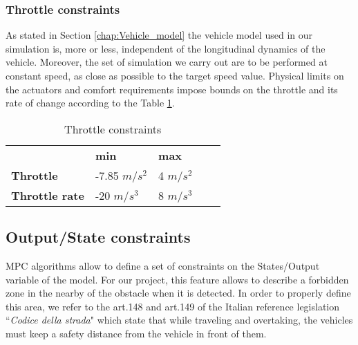 \subsubsection{Throttle constraints}
As stated in Section \ref{chap:Vehicle_model} the vehicle model used in our simulation is,  more or less, independent of the longitudinal dynamics of the vehicle. Moreover, the set of simulation we carry out are to be performed at constant speed, as close as possible to the target speed value. 
Physical limits on the actuators and comfort requirements impose bounds on the throttle and its rate of change according to the Table \ref{tab:throttle}.

\begin{table}[H]
\begin{center}
\begin{tabular}{lllll}
\cline{2-3}
\multicolumn{1}{l|}{} & \multicolumn{1}{l|}{\textbf{min}} & \multicolumn{1}{l|}{\textbf{max}} &  &  \\ \cline{1-3}
\multicolumn{1}{|l|}{\textbf{Throttle}} & \multicolumn{1}{l|}{-7.85 $m/s^2$}  & \multicolumn{1}{l|}{4 $m/s^2$} &  &  \\ \cline{1-3}
\multicolumn{1}{|l|}{\textbf{Throttle rate}} & \multicolumn{1}{l|}{-20 $m/s^3$}    & \multicolumn{1}{l|}{8 $m/s^3$} &  &  \\ \cline{1-3}
\end{tabular}
\caption{Throttle constraints}
\label{tab:throttle}
\end{center}
\end{table}

\subsection{Output/State constraints}
MPC algorithms allow to define a set of constraints on the States/Output variable of the model. For our project, this feature allows to describe a forbidden zone in the nearby of the obstacle when it is detected. In order to properly define this area, we refer to the art.148 and art.149 of the Italian reference legislation ``\textit{Codice della strada}" which state that while traveling and overtaking, the vehicles must keep a safety distance from the vehicle in front of them.


